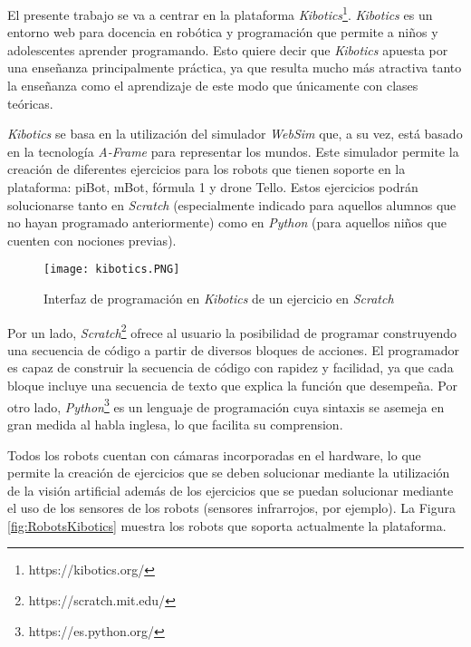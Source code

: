 El presente trabajo se va a centrar en la plataforma \textit{Kibotics}\footnote{https://kibotics.org/}. \textit{Kibotics} es un entorno web para docencia en robótica y programación que permite a niños y adolescentes aprender programando. Esto quiere decir que \textit{Kibotics}  apuesta por una enseñanza principalmente práctica, ya que resulta mucho más atractiva tanto la enseñanza como el aprendizaje de este modo que únicamente con clases teóricas. \newline

\textit{Kibotics}  se basa en la utilización del simulador \textit{WebSim}  que, a su vez, está basado en la tecnología \textit{A-Frame}  para representar los mundos. Este simulador permite la creación de diferentes ejercicios para los robots que tienen soporte en la plataforma: piBot, mBot, fórmula 1 y drone Tello. Estos ejercicios podrán solucionarse tanto en \textit{Scratch} (especialmente indicado para aquellos alumnos que no hayan programado anteriormente) como en \textit{Python} (para aquellos niños que cuenten con nociones previas). \newline

\begin{figure}[h!]
    \centering
    \texttt{[image: kibotics.PNG]}
    \caption{Interfaz de programación en \textit{Kibotics} de un ejercicio en \textit{Scratch}}
    \label{fig:kibotics}
\end{figure}

Por un lado, \textit{Scratch}\footnote{https://scratch.mit.edu/} ofrece al usuario la posibilidad de programar construyendo una secuencia de código a partir de diversos bloques de acciones. El programador es capaz de construir la secuencia de código con rapidez y facilidad, ya que cada bloque incluye una secuencia de texto que explica la función que desempeña. Por otro lado, \textit{Python}\footnote{https://es.python.org/} es un lenguaje de programación cuya sintaxis se asemeja en gran medida al habla inglesa, lo que facilita su comprension. \newline 


Todos los robots cuentan con cámaras incorporadas en el hardware, lo que permite la creación de ejercicios que se deben solucionar mediante la utilización de la visión artificial además de los ejercicios que se puedan solucionar mediante el uso de los sensores de los robots (sensores infrarrojos, por ejemplo). La Figura \ref{fig:RobotsKibotics} muestra los robots que soporta actualmente la plataforma.\newline


